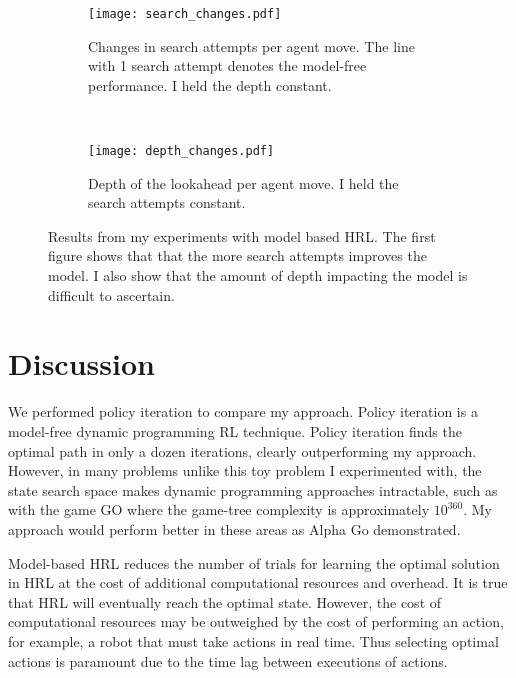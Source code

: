 \begin{figure*}[h]
    \centering
    \begin{subfigure}[h]{0.49\textwidth}
        \centering
        \texttt{[image: search\_changes.pdf]}
        \caption{Changes in search attempts per agent move. The line with 1 search attempt denotes the model-free performance. I held the depth constant.}
		\label{fig:search_changes}
    \end{subfigure}%
    ~ 
    \begin{subfigure}[h]{0.49\textwidth}
        \centering
        \texttt{[image: depth\_changes.pdf]}
        \caption{Depth of the lookahead per agent move. I held the search attempts constant.}
		\label{fig:depth_changes}
    \end{subfigure}
    \caption{Results from my experiments with model based HRL. The first figure shows that that the more search attempts improves the model. I also show that the amount of depth impacting the model is difficult to ascertain.}
\end{figure*}

\section{Discussion}
We performed policy iteration to compare my approach. Policy iteration is a model-free dynamic programming RL technique. Policy iteration finds the optimal path in only a dozen iterations, clearly outperforming my approach. However, in many problems unlike this toy problem I experimented with, the state search space makes dynamic programming approaches intractable, such as with the game GO where the game-tree complexity is approximately $10^{360}$. My approach would perform better in these areas as Alpha Go demonstrated.

Model-based HRL reduces the number of trials for learning the optimal solution in HRL at the cost of additional computational resources and overhead. It is true that HRL will eventually reach the optimal state. However, the cost of computational resources may be outweighed by the cost of performing an action, for example, a robot that must take actions in real time. Thus selecting optimal actions is paramount due to the time lag between executions of actions.


